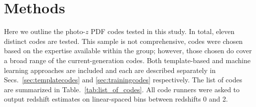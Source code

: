 \section{Methods}
\label{sec:pzcodes}


Here we outline the photo-$z$ PDF codes tested in this study. In total, eleven distinct codes are tested.  This sample is not comprehensive, codes were chosen based on the expertise available within the group; however, those chosen do cover a broad range of the current-generation codes.  Both template-based and machine learning approaches are included and each are described separately in Secs.~\ref{sec:templatecodes} and \ref{sec:trainingcodes} respectively. The list of codes are summarized in Table.~\ref{tab:list_of_codes}.  All code runners were asked to output redshift estimates on linear-spaced bins between redshifts 0 and 2.

